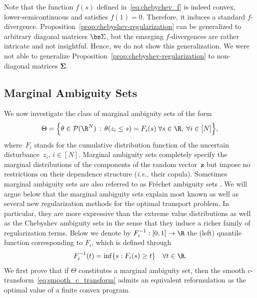\documentclass[11pt, a4paper, oneside, reqno]{article}
\begin{document}
	Note that the function  $f(s)$ defined in~\eqref{eq:chebychev_f} is indeed convex, lower-semicontinuous and satisfies $f(1)=0$. Therefore, it induces a standard $f$-divergence. Proposition~\ref{prop:chebyshev-regularization} can be generalized to arbitrary diagonal matrices $\bs \Sigma$, but the emerging $f$-divergences are rather intricate and not insightful. Hence, we do not show this generalization. We were not able to generalize Proposition~\ref{prop:chebyshev-regularization} to non-diagonal matrices $\bm \Sigma$.
	
	
	\subsection{Marginal Ambiguity Sets}
	\label{sec:marginal}
	We now investigate the class of marginal ambiguity sets of the form
	\begin{equation}
	    \label{eq:marginal_ambiguity_set}
	    \Theta = \Big\{ \theta \in \mathcal{P}(\R^N) \, : \, \theta(z_i \leq s) = F_i(s)\;\forall s\in \R, \; \forall i \in [N] \Big\},
	\end{equation}
	where~$F_i$ stands for the cumulative distribution function of the uncertain disturbance~$z_i$, $i\in[N]$. Marginal ambiguity sets completely specify the marginal distributions of the components of the random vector~$\bm z$ but impose no restrictions on their dependence structure ({\em i.e.}, their copula). Sometimes marginal ambiguity sets are also referred to as Fr\'echet ambiguity sets \citep{frechet1951}. We will argue below that the marginal ambiguity sets explain most known as well as several new regularization methods for the optimal transport problem. In particular, they are more expressive than the extreme value distributions as well as the Chebyshev ambiguity sets in the sense that they induce a richer family of regularization terms. Below we denote by $F_i^{-1} : [0, 1] \to \R$ the (left) quantile function corresponding to $F_i$, which is defined through
	$$ 
	    F_i^{-1}(t) = \inf \{s :F_i(s) \geq t \}\quad \forall t\in\R.
	$$
	We first prove that if $\Theta$ constitutes a marginal ambiguity set, then the smooth $c$-transform~\eqref{eq:smooth_c_transform} admits an equivalent reformulation as the optimal value of a finite convex program.
	
\end{document}
